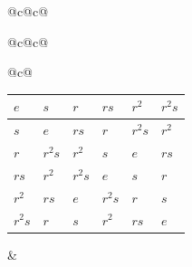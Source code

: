 \documentclass[12pt,UTF8,fontset=none]{ctexbook}
\begin{document}
\begin{figure}[htbp]
\begin{tabular}[t]{@{}c@{\hspace{2.5cm}}c@{}}
\begin{tabular}{@{}c@{\hspace{4pt}}c@{}}
\begin{tabular}{@{}c@{}}
                \begin{tabular}{|*{6}{>{\centering\arraybackslash}p{\colwidth}|}}
                    \hline
                    \cellcolor{c0}$e$ & \cellcolor{c3}$s$ & \cellcolor{c1}$r$ & \cellcolor{c4}$rs$ & \cellcolor{c2}$r^2$ & \cellcolor{c5}$r^2s$ \\ \hline
                    \cellcolor{c3}$s$ & \cellcolor{c0}$e$ & \cellcolor{c4}$rs$ & \cellcolor{c1}$r$ & \cellcolor{c5}$r^2s$ & \cellcolor{c2}$r^2$ \\ \hline
                    \cellcolor{c1}$r$ & \cellcolor{c5}$r^2s$ & \cellcolor{c2}$r^2$ & \cellcolor{c3}$s$ & \cellcolor{c0}$e$ & \cellcolor{c4}$rs$ \\ \hline
                    \cellcolor{c4}$rs$ & \cellcolor{c2}$r^2$ & \cellcolor{c5}$r^2s$ & \cellcolor{c0}$e$ & \cellcolor{c3}$s$ & \cellcolor{c1}$r$ \\ \hline
                    \cellcolor{c2}$r^2$ & \cellcolor{c4}$rs$ & \cellcolor{c0}$e$ & \cellcolor{c5}$r^2s$ & \cellcolor{c1}$r$ & \cellcolor{c3}$s$ \\ \hline
                    \cellcolor{c5}$r^2s$ & \cellcolor{c1}$r$ & \cellcolor{c3}$s$ & \cellcolor{c2}$r^2$ & \cellcolor{c4}$rs$ & \cellcolor{c0}$e$ \\ \hline
                \end{tabular}
            \end{tabular}

        \end{tabular}
        &
        

\end{tabular}
\end{figure}
\end{document}
